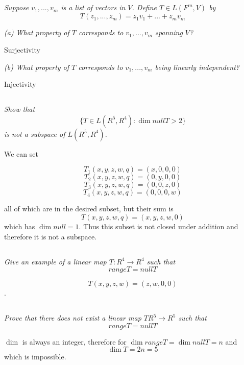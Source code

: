 \documentclass[11pt,oneside,titlepage]{book}
\begin{document}
\subsection{}
\textit{Suppose $v_1, ...,  v_m$ is a list of vectors in $V$. Define $T \in L(F^m, V)$ by}
$$T(z_1, ..., z_m) = z_1 v_1 + ... + z_m v_m$$

\textit{(a) What property of $T$ corresponds to $v_1, ..., v_m$ spanning $V$?}

Surjectivity

\textit{(b) What property of $T$ corresponds to $v_1, ..., v_m$ being linearly independent?}

Injectivity

\subsection{}

\textit{Show that }
$$ \{T \in L(R^5, R^4): \dim null T > 2 \}$$
\textit{is not a subspace of $L(R^5, R^4)$.}

We can set

$$T_1(x, y, z, w, q) = (x, 0, 0, 0)$$
$$T_2(x, y, z, w, q) = (0, y, 0, 0)$$
$$T_3(x, y, z, w, q) = (0, 0, z, 0)$$
$$T_4(x, y, z, w, q) = (0, 0, 0, w)$$

all of which are in the desired subset, but their sum is
$$T(x, y, z, w, q) = (x, y, z, w, 0)$$
which has $\dim null = 1$. Thus this subset is not closed under addition and therefore it
is not a subspace.

\subsection{}

\textit{Give an example of a linear map $T: R^4 \to R^4$ such that }
$$range T = null T$$

$$T(x, y, z, w) = (z, w, 0, 0)$$.

\subsection{}

\textit{Prove that there does not exist a linear map $T R^5 \to R^5$ such that }
$$range T = null T$$

$\dim$ is always an integer, therefore for $\dim range T = \dim null T = n$ and
$$\dim T = 2n = 5$$
which is impossible.

\subsection{}
\end{document}

